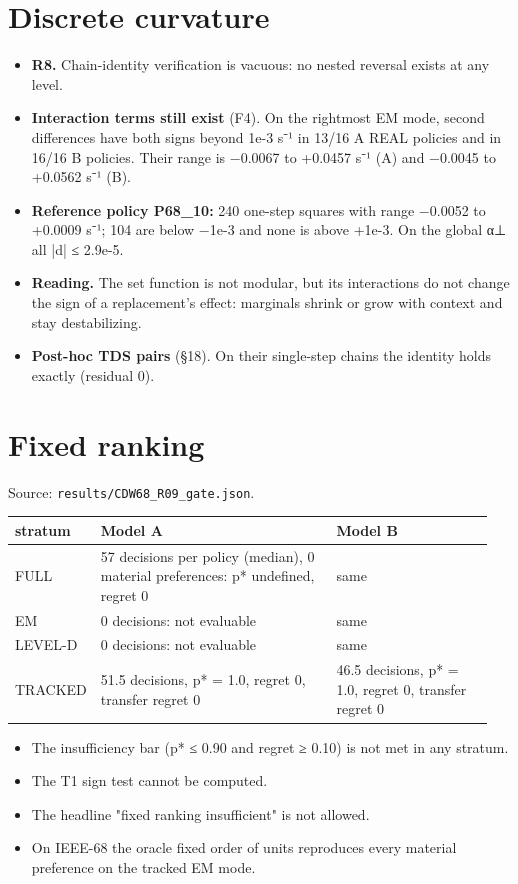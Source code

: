 \documentclass[10pt,a4paper]{article}
\begin{document}
\section{Discrete curvature}
\begin{itemize}
\item \textbf{R8.} Chain-identity verification is vacuous: no nested reversal exists at any level.
\item \textbf{Interaction terms still exist} (F4). On the rightmost EM mode, second differences have both signs beyond 1e-3 s⁻¹ in 13/16 A REAL policies and in 16/16 B policies. Their range is −0.0067 to +0.0457 s⁻¹ (A) and −0.0045 to +0.0562 s⁻¹ (B).
\item \textbf{Reference policy P68\_10:} 240 one-step squares with range −0.0052 to +0.0009 s⁻¹; 104 are below −1e-3 and none is above +1e-3. On the global α⊥ all |d| ≤ 2.9e-5.
\item \textbf{Reading.} The set function is not modular, but its interactions do not change the sign of a replacement's effect: marginals shrink or grow with context and stay destabilizing.
\item \textbf{Post-hoc TDS pairs} (§18). On their single-step chains the identity holds exactly (residual 0).
\end{itemize}
\section{Fixed ranking}
Source: \texttt{results/\allowbreak{}CDW68\_\allowbreak{}R09\_\allowbreak{}gate.json}.

{\small
\begin{longtable}{L{0.060\linewidth}L{0.537\linewidth}L{0.356\linewidth}}
\toprule
\textbf{stratum} & \textbf{Model A} & \textbf{Model B} \\
\midrule
\endhead
FULL & 57 decisions per policy (median), 0 material preferences: p* undefined, regret 0 & same \\
EM & 0 decisions: not evaluable & same \\
LEVEL-D & 0 decisions: not evaluable & same \\
TRACKED & 51.5 decisions, p* = 1.0, regret 0, transfer regret 0 & 46.5 decisions, p* = 1.0, regret 0, transfer regret 0 \\
\bottomrule
\end{longtable}}
\begin{itemize}
\item The insufficiency bar (p* ≤ 0.90 and regret ≥ 0.10) is not met in any stratum.
\item The T1 sign test cannot be computed.
\item The headline "fixed ranking insufficient" is not allowed.
\item On IEEE-68 the oracle fixed order of units reproduces every material preference on the tracked EM mode.
\end{itemize}
\end{document}
